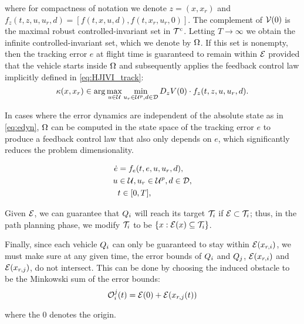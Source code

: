 \noindent where for compactness of notation we denote $z=(x,x_r)$ and $f_z(t,z,u,u_r,d) = [f(t,x,u,d),f(t,x_r,u_r,0)]$. The complement of $\mathcal{V}(0)$ is the maximal robust controlled-invariant set in $\mathcal{T}^\text{c}$. Letting $T\to\infty$ we obtain the infinite controlled-invariant set, which we denote by $\Omega$. If this set is nonempty, then the tracking error $e$ at flight time is guaranteed to remain within $\mathcal{E}$ provided that the vehicle starts inside $\Omega$ and subsequently applies the feedback control law implicitly defined in \eqref{eq:HJIVI_track}:
\begin{equation}\label{eq:robust_tracking_law}
\kappa(x,x_r) \in \arg\max_{u \in \mathcal{U}} \min_{u_r \in\mathcal{U}^p, d \in \mathcal{D}} D_z V(0) \cdot f_z(t,z,u,u_r,d).
\end{equation}

In cases where the error dynamics are independent of the absolute state as in \eqref{eq:edyn}, $\Omega$ can be computed in the state space of the tracking error $e$ to produce a feedback control law that also only depends on $e$, which significantly reduces the problem dimensionality.

\begin{equation}
\label{eq:edyn} %
\begin{aligned}
\dot{e} &= f_e(t, e, u, u_r,d), \\
u &\in \cset, u_r\in\cset^p, d \in \dset, \\
&t \in [0, T],
\end{aligned}
\end{equation}

Given $\mathcal{E}$, we can guarantee that $Q_i$ will reach its target $\mathcal{T}_i$ if $\mathcal{E} \subset \mathcal{T}_i$; thus, in the path planning phase, we modify $\mathcal{T}_i$ to be $\{x: \mathcal{E}(x) \subseteq \mathcal{T}_i\}$.

Finally, since each vehicle $Q_i$ can only be guaranteed to stay within $\mathcal{E}(x_{r,i})$, we must make sure at any given time, the error bounds of $Q_i$ and $Q_j$, $\mathcal{E}(x_{r,i})$ and $\mathcal{E}(x_{r,j})$, do not intersect. This can be done by choosing the induced obstacle to be the Minkowski sum of the error bounds:
\begin{equation}
\mathcal{O}_i^j(t) = \mathcal{E}(0) + \mathcal{E}(x_{r,j}(t))
\end{equation}

\noindent where the $0$ denotes the origin.


